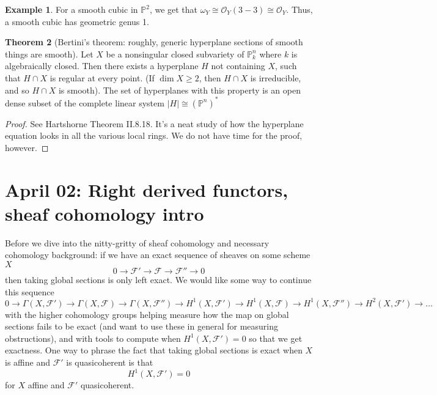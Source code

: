 \documentclass[10pt,reqno]{amsart}
\theoremstyle{definition}
\newtheorem{theorem}{Theorem}
\newtheorem{example}[theorem]{Example}
\theoremstyle{remark}
\numberwithin{equation}{section}
\numberwithin{theorem}{section}
\newcommand{\OO}{{\mathcal O}}
\newcommand{\FF}{{\mathscr F}}
\newcommand{\PP}{{\mathbb P}}
\begin{document}
\begin{example}
For a smooth cubic in $\PP^2$, we get that $\omega_Y \cong \OO_Y(3-3) \cong \OO_Y$. Thus, a smooth cubic has geometric genus 1.
\end{example}

\begin{theorem}[Bertini's theorem: roughly, generic hyperplane sections of smooth things are smooth] Let $X$ be a nonsingular closed subvariety of $\PP^n_k$ where $k$ is algebraically closed. Then there exists a hyperplane $H$ not containing $X$, such that $H \cap X$ is regular at every point. (If $\dim X \ge 2$, then $H \cap X$ is irreducible, and so $H \cap X$ is smooth). The set of hyperplanes with this property is an open dense subset of the complete linear system $|H| \cong (\PP^n)^*$
\end{theorem}
\begin{proof}
See Hartshorne Theorem II.8.18. It's a neat study of how the hyperplane equation looks in all the various local rings. We do not have time for the proof, however.
\end{proof}

\section{April 02: Right derived functors, sheaf cohomology intro}

Before we dive into the nitty-gritty of sheaf cohomology and necessary cohomology background: if we have an exact sequence of sheaves on some scheme $X$
\[0 \to \FF' \to \FF \to \FF'' \to 0\]
 then taking global sections is only left exact. We would like some way to continue this sequence
\[0 \to \Gamma(X,\FF') \to \Gamma(X,\FF) \to \Gamma(X,\FF'') \to H^1(X,\FF') \to H^1(X,\FF) \to H^1(X,\FF'') \to H^2(X,\FF') \to \dots\]
with the higher cohomology groups helping measure how the map on global sections fails to be exact (and want to use these in general for measuring obstructions), and with tools to compute when $H^1(X,\FF') = 0$ so that we get exactness. One way to phrase the fact that taking global sections is exact when $X$ is affine and $\FF'$ is quasicoherent is that
\[H^1(X,\FF') = 0\]
for $X$ affine and $\FF'$ quasicoherent.
\end{document}
